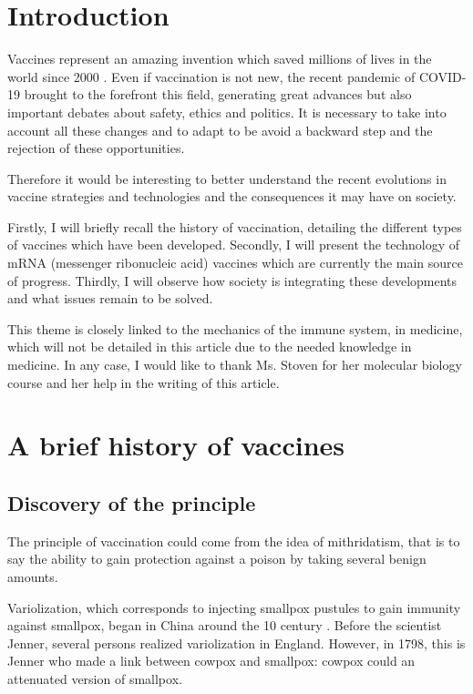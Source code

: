 \documentclass{article}
\begin{document}
    

    \section{Introduction}

    Vaccines represent an amazing invention which saved millions of lives in the world since 2000 \autocite{HowManyLives2021}.
    Even if vaccination is not new, the recent pandemic of COVID-19 brought to the forefront this field, generating great advances but also important debates about safety, ethics and politics.
    It is necessary to take into account all these changes and to adapt to be avoid a backward step and the rejection of these opportunities. 
    
    Therefore it would be interesting to better understand the recent evolutions in vaccine strategies and technologies and the consequences it may have on society.
    
    Firstly, I will briefly recall the history of vaccination, detailing the different types of vaccines which have been developed.
    Secondly, I will present the technology of mRNA (messenger ribonucleic acid) vaccines which are currently the main source of progress.
    Thirdly, I will observe how society is integrating these developments and what issues remain to be solved.

    This theme is closely linked to the mechanics of the immune system, in medicine, which will not be detailed in this article due to the needed knowledge in medicine.
    In any case, I would like to thank Ms. Stoven for her molecular biology course and her help in the writing of this article.

    \section{A brief history of vaccines}

        \subsection{Discovery of the principle}

            The principle of vaccination could come from the idea of mithridatism, that is to say the ability to gain protection against a poison by taking several benign amounts.
            
            Variolization, which corresponds to injecting smallpox pustules to gain immunity against smallpox, began in China around the 10 century \autocite{canouiHistoryPrinciplesVaccination2019}. 
            Before the scientist Jenner, several persons realized variolization in England. However, in 1798, this is Jenner who made a link between cowpox and smallpox: 
                cowpox could an attenuated version of smallpox.            
\end{document}
